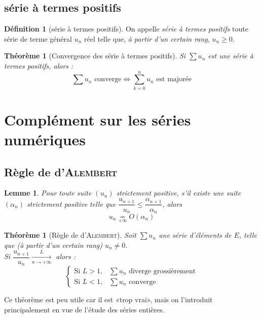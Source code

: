 \documentclass[11pt,a4paper]{report}
\newtheorem{itheorem}[theorem]{Théorème}
\newtheorem{lemme}[theorem]{Lemme}
\theoremstyle{definition}
\newtheorem{dfn}[theorem]{Définition}
\begin{document}
\subsection{série à termes positifs}
\begin{dfn}[série à termes positifs]
    On appelle \emph{série à termes positifs} toute série de terme général $u_n$ réel telle que, \emph{à partir d'un certain rang}, $u_n \ge 0$.
\end{dfn}
\begin{itheorem}[Convergence des série à termes positifs]
    Si $\sum u_n$ est une série à termes positifs, alors :
    \begin{equation}
        \sum u_n \text{ converge} \Leftrightarrow \sum_{k=0}^n u_n \text{ est majorée}
    \end{equation}
\end{itheorem}
\section{Complément sur les séries numériques} %
\label{sec:complement_sur_les_series_numeriques}
\subsection{Règle de d'\textsc{Alembert}} %
\label{sub:regle_de_d_alembert}
\begin{lemme}
    Pour toute suite $(u_n)$ \emph{strictement positive}, s'il existe une suite $(\alpha_n)$ \emph{strictement positive} telle que $\dfrac{u_{n+1}}{u_n}\le \dfrac{\alpha_{n+1}}{\alpha_n}$, alors 
    \begin{equation}
    u_n \underset{+\infty}{=} O(\alpha_n)
    \end{equation}
\end{lemme}
\begin{itheorem}[Règle de d'\textsc{Alembert}]\label{th:Regle_de_dAlembert}
    Soit $\sum u_n$ une série d'éléments de $E$, telle que (à partir d'un certain rang) $u_n \neq 0$.\\
    Si $\dfrac{u_{n+1}}{u_n} \xrightarrow[n\to +\infty] L$ alors :
    \begin{equation}
    \left\lbrace
    \begin{aligned}
        \text{Si } L >1, & \sum u_n \text{ diverge grossièrement}   \\
        \text{Si } L <1, & \sum u_n \text{ converge} 
    \end{aligned}
    \right.
    \end{equation}
\end{itheorem}
Ce théorème est peu utile car il est «{}trop vrai»{}, mais on l'introduit principalement en vue de l'étude des séries entières.
\end{document}
